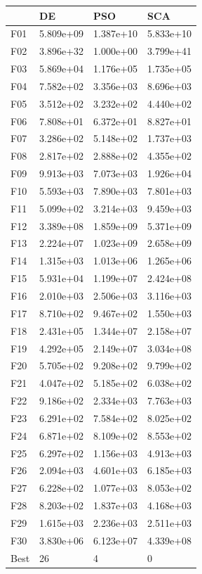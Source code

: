 \begin{tabular}{llll}
\toprule
{} &         DE &        PSO &        SCA \\
\midrule
F01  &  5.809e+09 &  1.387e+10 &  5.833e+10 \\
F02  &  3.896e+32 &  1.000e+00 &  3.799e+41 \\
F03  &  5.869e+04 &  1.176e+05 &  1.735e+05 \\
F04  &  7.582e+02 &  3.356e+03 &  8.696e+03 \\
F05  &  3.512e+02 &  3.232e+02 &  4.440e+02 \\
F06  &  7.808e+01 &  6.372e+01 &  8.827e+01 \\
F07  &  3.286e+02 &  5.148e+02 &  1.737e+03 \\
F08  &  2.817e+02 &  2.888e+02 &  4.355e+02 \\
F09  &  9.913e+03 &  7.073e+03 &  1.926e+04 \\
F10  &  5.593e+03 &  7.890e+03 &  7.801e+03 \\
F11  &  5.099e+02 &  3.214e+03 &  9.459e+03 \\
F12  &  3.389e+08 &  1.859e+09 &  5.371e+09 \\
F13  &  2.224e+07 &  1.023e+09 &  2.658e+09 \\
F14  &  1.315e+03 &  1.013e+06 &  1.265e+06 \\
F15  &  5.931e+04 &  1.199e+07 &  2.424e+08 \\
F16  &  2.010e+03 &  2.506e+03 &  3.116e+03 \\
F17  &  8.710e+02 &  9.467e+02 &  1.550e+03 \\
F18  &  2.431e+05 &  1.344e+07 &  2.158e+07 \\
F19  &  4.292e+05 &  2.149e+07 &  3.034e+08 \\
F20  &  5.705e+02 &  9.208e+02 &  9.799e+02 \\
F21  &  4.047e+02 &  5.185e+02 &  6.038e+02 \\
F22  &  9.186e+02 &  2.334e+03 &  7.763e+03 \\
F23  &  6.291e+02 &  7.584e+02 &  8.025e+02 \\
F24  &  6.871e+02 &  8.109e+02 &  8.553e+02 \\
F25  &  6.297e+02 &  1.156e+03 &  4.913e+03 \\
F26  &  2.094e+03 &  4.601e+03 &  6.185e+03 \\
F27  &  6.228e+02 &  1.077e+03 &  8.053e+02 \\
F28  &  8.203e+02 &  1.837e+03 &  4.168e+03 \\
F29  &  1.615e+03 &  2.236e+03 &  2.511e+03 \\
F30  &  3.830e+06 &  6.123e+07 &  4.339e+08 \\
Best &         26 &          4 &          0 \\
\bottomrule
\end{tabular}
